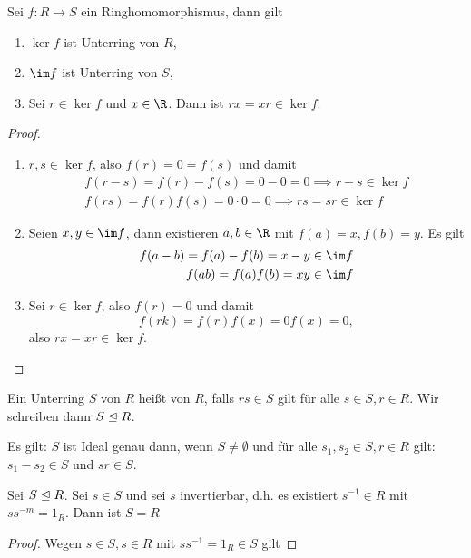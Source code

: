 \begin{lem} %
	Sei $f: R \to S$ ein Ringhomomorphismus, dann gilt
	\begin{enumerate}[1.]
		\item
			$\ker f$ ist Unterring von $R$,
		\item
			$\im f$ ist Unterring von $S$,
		\item
			Sei $r \in \ker f$ und $x \in \R$.
			Dann ist $rx = xr \in \ker f$.
	\end{enumerate}
	\begin{proof}
		\begin{enumerate}[1.]
			\item
				$r, s \in \ker f$, also $f(r) = 0 = f(s)$ und damit
				\begin{align*}
					f(r - s) = f(r) - f(s) = 0 - 0 = 0 \implies r- s \in \ker f \\
					f(rs) = f(r) f(s) = 0 \cdot 0 = 0 \implies rs = sr \in \ker f
				\end{align*}
			\item
				Seien $x, y \in \im f$, dann existieren $a, b \in \R$ mit $f(a) = x, f(b) = y$.
				Es gilt
				\begin{align*}
					f(a - b) = f(a) - f(b) = x - y \in \im f \\
					f(a b) = f(a) f(b) = x y \in \im f
				\end{align*}
			\item
				Sei $r \in \ker f$, also $f(r) = 0$ und damit
				\[
					f(r k) = f(r)f(x) = 0 f(x) = 0,
				\]
				also $rx = xr \in \ker f$.
		\end{enumerate}
	\end{proof}
\end{lem}

\begin{df}
	Ein Unterring $S$ von $R$ heißt  von $R$, falls $rs \in S$ gilt für alle $s \in S, r \in R$.
	Wir schreiben dann $S \trianglelefteq R$.
	\begin{note}
		Es gilt: $S$ ist Ideal genau dann, wenn $S \neq \emptyset$ und für alle $s_1, s_2 \in S, r \in R$ gilt: $s_1 - s_2 \in S$ und $sr \in S$.
	\end{note}
\end{df}

\begin{ex}
	Sei $S \trianglelefteq R$.
	Sei $s \in S$ und sei $s$ invertierbar, d.h. es existiert $s^{-1} \in R$ mit $ss^{-m} = 1_R$.
	Dann ist $S = R$
	\begin{proof}
		Wegen $s \in S, s \in R$ mit $ss^{-1} = 1_R \in S$ gilt %
	\end{proof}
\end{ex}





